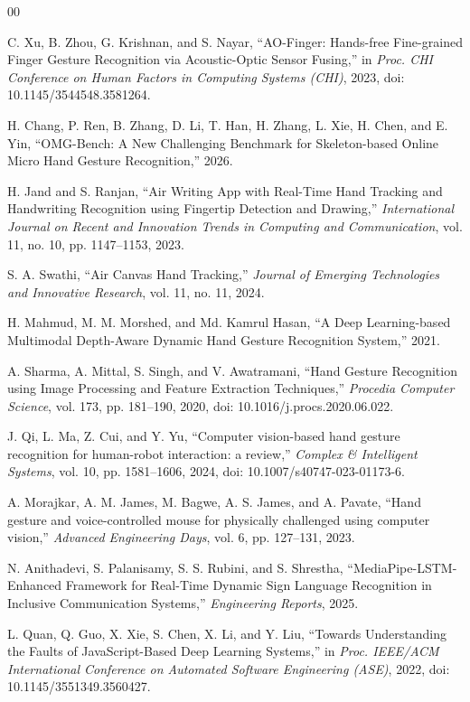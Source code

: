 \documentclass[conference]{IEEEtran}
\begin{document}
\begin{thebibliography}{00}

C. Xu, B. Zhou, G. Krishnan, and S. Nayar,
``AO-Finger: Hands-free Fine-grained Finger Gesture Recognition via Acoustic-Optic Sensor Fusing,''
in \emph{Proc. CHI Conference on Human Factors in Computing Systems (CHI)}, 2023,
doi: 10.1145/3544548.3581264.

H. Chang, P. Ren, B. Zhang, D. Li, T. Han, H. Zhang, L. Xie,
H. Chen, and E. Yin,
``OMG-Bench: A New Challenging Benchmark for Skeleton-based Online Micro Hand Gesture Recognition,''
2026.

H. Jand and S. Ranjan,
``Air Writing App with Real-Time Hand Tracking and Handwriting Recognition using Fingertip Detection and Drawing,''
\emph{International Journal on Recent and Innovation Trends in Computing and Communication},
vol. 11, no. 10, pp. 1147--1153, 2023.

S. A. Swathi,
``Air Canvas Hand Tracking,''
\emph{Journal of Emerging Technologies and Innovative Research},
vol. 11, no. 11, 2024.

H. Mahmud, M. M. Morshed, and Md. Kamrul Hasan,
``A Deep Learning-based Multimodal Depth-Aware Dynamic Hand Gesture Recognition System,''
2021.

A. Sharma, A. Mittal, S. Singh, and V. Awatramani,
``Hand Gesture Recognition using Image Processing and Feature Extraction Techniques,''
\emph{Procedia Computer Science},
vol. 173, pp. 181--190, 2020,
doi: 10.1016/j.procs.2020.06.022.

J. Qi, L. Ma, Z. Cui, and Y. Yu,
``Computer vision-based hand gesture recognition for human-robot interaction: a review,''
\emph{Complex \& Intelligent Systems},
vol. 10, pp. 1581--1606, 2024,
doi: 10.1007/s40747-023-01173-6.

A. Morajkar, A. M. James, M. Bagwe, A. S. James, and A. Pavate,
``Hand gesture and voice-controlled mouse for physically challenged using computer vision,''
\emph{Advanced Engineering Days},
vol. 6, pp. 127--131, 2023.

N. Anithadevi, S. Palanisamy, S. S. Rubini, and S. Shrestha,
``MediaPipe-LSTM-Enhanced Framework for Real-Time Dynamic Sign Language Recognition in Inclusive Communication Systems,''
\emph{Engineering Reports}, 2025.

L. Quan, Q. Guo, X. Xie, S. Chen, X. Li, and Y. Liu,
``Towards Understanding the Faults of JavaScript-Based Deep Learning Systems,''
in \emph{Proc. IEEE/ACM International Conference on Automated Software Engineering (ASE)}, 2022,
doi: 10.1145/3551349.3560427.


\end{thebibliography}
\end{document}

